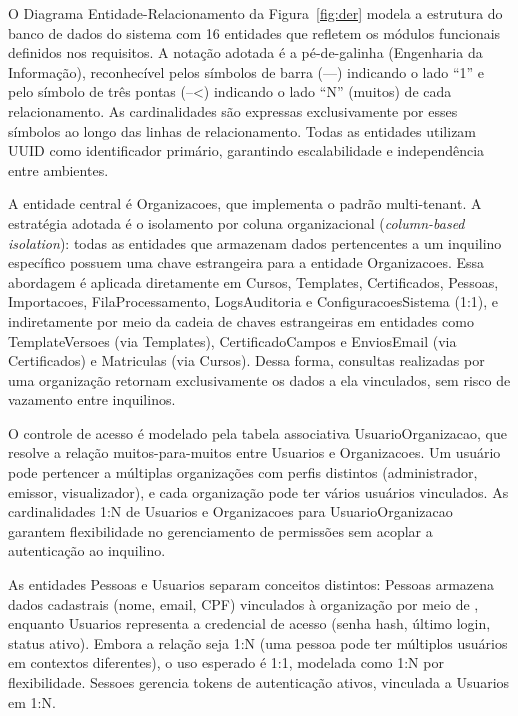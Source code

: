 O Diagrama Entidade-Relacionamento da Figura~\ref{fig:der} modela a estrutura do banco de dados do sistema com 16 entidades que refletem os módulos funcionais definidos nos requisitos. A notação adotada é a pé-de-galinha (Engenharia da Informação), reconhecível pelos símbolos de barra (---) indicando o lado ``1'' e pelo símbolo de três pontas (--<) indicando o lado ``N'' (muitos) de cada relacionamento. As cardinalidades são expressas exclusivamente por esses símbolos ao longo das linhas de relacionamento. Todas as entidades utilizam UUID como identificador primário, garantindo escalabilidade e independência entre ambientes.

A entidade central é Organizacoes, que implementa o padrão multi-tenant. A estratégia adotada é o isolamento por coluna organizacional (\textit{column-based isolation}): todas as entidades que armazenam dados pertencentes a um inquilino específico possuem uma chave estrangeira  para a entidade Organizacoes. Essa abordagem é aplicada diretamente em Cursos, Templates, Certificados, Pessoas, Importacoes, FilaProcessamento, LogsAuditoria e ConfiguracoesSistema (1:1), e indiretamente por meio da cadeia de chaves estrangeiras em entidades como TemplateVersoes (via Templates), CertificadoCampos e EnviosEmail (via Certificados) e Matriculas (via Cursos). Dessa forma, consultas realizadas por uma organização retornam exclusivamente os dados a ela vinculados, sem risco de vazamento entre inquilinos.

O controle de acesso é modelado pela tabela associativa UsuarioOrganizacao, que resolve a relação muitos-para-muitos entre Usuarios e Organizacoes. Um usuário pode pertencer a múltiplas organizações com perfis distintos (administrador, emissor, visualizador), e cada organização pode ter vários usuários vinculados. As cardinalidades 1:N de Usuarios e Organizacoes para UsuarioOrganizacao garantem flexibilidade no gerenciamento de permissões sem acoplar a autenticação ao inquilino.

As entidades Pessoas e Usuarios separam conceitos distintos: Pessoas armazena dados cadastrais (nome, email, CPF) vinculados à organização por meio de , enquanto Usuarios representa a credencial de acesso (senha hash, último login, status ativo). Embora a relação seja 1:N (uma pessoa pode ter múltiplos usuários em contextos diferentes), o uso esperado é 1:1, modelada como 1:N por flexibilidade. Sessoes gerencia tokens de autenticação ativos, vinculada a Usuarios em 1:N.

